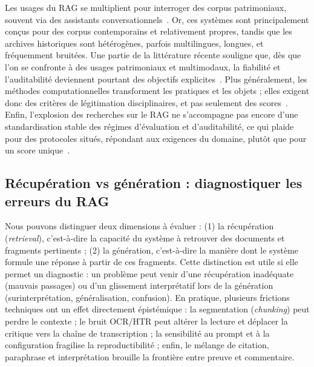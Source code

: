 \documentclass[final, fra]{anthology-ch}     %
\begin{document}
Les usages du RAG se multiplient pour interroger des corpus patrimoniaux, souvent via des assistants conversationnels~\cite{tran-etal-2024-rag-historical-newspapers,cherukuri2025oralhistory,karidi-etal-2025-kgdrivenrag,kelly2025folkrag,lee2025joseonrag,lin-etal-2025-preliminary,mudet2025hybridrag,sergeev2025talking}. 
Or, ces systèmes sont principalement conçus pour des corpus contemporains et relativement propres, tandis que les archives historiques sont hétérogènes, parfois multilingues, longues, et fréquemment bruitées. 
Une partie de la littérature récente souligne que, dès que l’on se confronte à des usages patrimoniaux et multimodaux, la fiabilité et l’auditabilité deviennent pourtant des objectifs explicites~\cite{abdelfattah2025fromRecognitionToReliability}. 
Plus généralement, les méthodes computationnelles transforment les pratiques et les objets ; elles exigent donc des critères de légitimation disciplinaires, et pas seulement des scores~\cite{armand2023beyonddh}. 
Enfin, l’explosion des recherches sur le RAG ne s’accompagne pas encore d’une standardisation stable des régimes d’évaluation et d’auditabilité, ce qui plaide pour des protocoles situés, répondant aux exigences du domaine, plutôt que pour un score unique~\cite{brown2025systematicrag}.

\subsection{Récupération vs génération : diagnostiquer les erreurs du RAG}

Nous pouvons distinguer deux dimensions à évaluer : (1) la récupération (\textit{retrieval}), c’est-à-dire la capacité du système à retrouver des documents et fragments pertinents ; (2) la génération, c’est-à-dire la manière dont le système formule une réponse à partir de ces fragments. 
Cette distinction est utile si elle permet un diagnostic : un problème peut venir d’une récupération inadéquate (mauvais passages) ou d’un glissement interprétatif lors de la génération (surinterprétation, généralisation, confusion). 
En pratique, plusieurs frictions techniques ont un effet directement épistémique : la segmentation (\textit{chunking}) peut perdre le contexte ; le bruit OCR/HTR peut altérer la lecture et déplacer la critique vers la chaîne de transcription ; la sensibilité au prompt et à la configuration fragilise la reproductibilité ; enfin, le mélange de citation, paraphrase et interprétation brouille la frontière entre preuve et commentaire.
\end{document}
